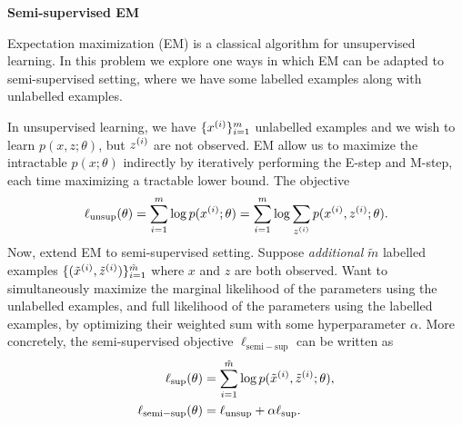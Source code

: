 \documentclass[12pt,letterpaper,boxed]{hmcpset}
\newcommand{\lunsup}{\ell_{\mathrm{unsup}}}
\newcommand{\lsup}{\ell_{\mathrm{sup}}}
\newcommand{\lsemi}{\ell_{\mathrm{semi-sup}}}
\begin{document}
\begin{problem}[Problem 4]
  \textbf{Semi-supervised EM}

  Expectation maximization (EM) is a classical algorithm for unsupervised learning. In this problem we explore one ways in which EM can be adapted to semi-supervised setting, where we have some labelled examples along with unlabelled examples.

  In unsupervised learning, we have $\{\xx\}_{i=1}^m$ unlabelled examples and we wish to learn $p(x, z; \theta)$, but $\zz$ are not observed. EM allow us to maximize the intractable $p(x; \theta)$ indirectly by iteratively performing the E-step and M-step, each time maximizing a tractable lower bound. The objective
  \[
  \begin{aligned}
    \ell_{\mathrm{unsup}}(\theta) = \sum_{i=1}^m \log p(\xx; \theta) = \sum_{i=1}^m \log \sum_{\zz} p(\xx, \zz; \theta).
  \end{aligned}
  \]
  Now, extend EM to semi-supervised setting. Suppose \emph{additional} $\tilde{m}$ labelled examples $\{(\txx, \tzz)\}_{i=1}^{\tilde{m}}$ where $x$ and $z$ are both observed. Want to simultaneously maximize the marginal likelihood of the parameters using the unlabelled examples, and full likelihood of the parameters using the labelled examples, by optimizing their weighted sum with some hyperparameter $\alpha$. More concretely, the semi-supervised objective $\lsemi$ can be written as 
  \[
  \begin{aligned}
    \lsup(\theta) &= \sum_{i=1}^{\tilde{m}} \log p(\txx, \tzz; \theta), \\
    \lsemi(\theta) &= \lunsup + \alpha \lsup.
  \end{aligned}
  \]
\end{problem}
\end{document}
